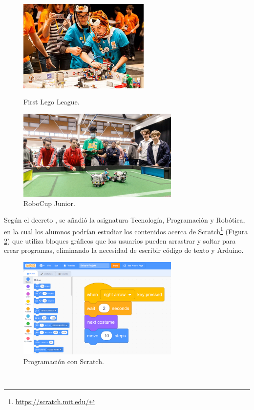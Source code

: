 \begin{figure}[h!]
  \begin{minipage}{0.48\textwidth}
    \centering
    \includegraphics[width=6.5cm]{figs/first-lego-league.jpg}
    \caption{First Lego League.}
    \label{fig:First Lego League}
  \end{minipage}
  \hfill
  \begin{minipage}{0.48\textwidth}
    \centering
    \includegraphics[width=8cm]{figs/RoboCup_junior.jpg}
    \caption{RoboCup Junior.} 
    \label{fig:RoboCup Junior}
  \end{minipage}
\end{figure}


Según el decreto \cite{Madrid}, se añadió la asignatura Tecnología, Programación y Robótica, en la cual los alumnos podrían estudiar los contenidos acerca de Scratch\footnote{\url{https://scratch.mit.edu/}} (Figura \ref{fig:scratch}) que utiliza bloques gráficos que los usuarios pueden arrastrar y soltar para crear programas, eliminando la necesidad de escribir código de texto y Arduino. 

\begin{figure} [h!]
  \begin{center}
    \includegraphics[width=8cm]{figs/scratch.png}
  \end{center}
  \caption{Programación con Scratch.}
  \label{fig:scratch}
\end{figure}\

